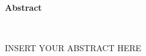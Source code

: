\vspace{80ex}

\begin{center}
\begin{Large}
\textbf{Abstract}
\end{Large} \\
\vspace{3ex}
\begin{small}
INSERT YOUR ABSTRACT HERE
\end{small}
\end{center}
\newpage
